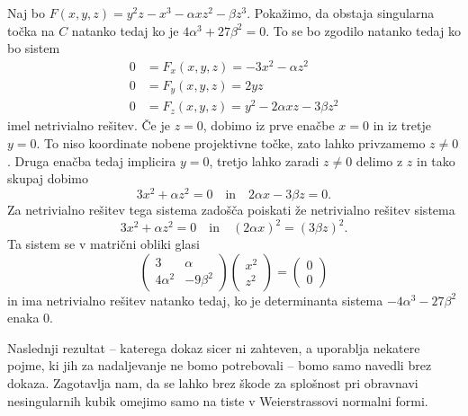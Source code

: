 \documentclass[mat1]{fmfdelo}
\numberwithin{equation}{section}
\theoremstyle{definition}
\begin{document}
\begin{dokaz}
    Naj bo $F(x,y,z) = y^2z - x^3 - \alpha xz^2 - \beta z^3$. Pokažimo, da obstaja singularna točka na $C$ natanko tedaj ko je $4\alpha^3 + 27\beta^2 = 0$. To se bo zgodilo natanko tedaj ko bo sistem
    \begin{align*}
        0 &= F_x(x,y,z) = -3x^2 - \alpha z^2\\
        0 &= F_y(x,y,z) = 2yz\\
        0 &= F_z(x,y,z) = y^2 - 2\alpha xz - 3 \beta z^2
    \end{align*}
    imel netrivialno rešitev. Če je $z = 0$, dobimo iz prve enačbe $x = 0$ in iz tretje $y = 0$. To niso koordinate nobene projektivne točke, zato lahko privzamemo $z \neq 0$. Druga enačba tedaj implicira $y = 0$, tretjo lahko zaradi $z \neq 0$ delimo z $z$ in tako skupaj dobimo
    \[
        3x^2 + \alpha z^2 = 0 \quad \text{in} \quad 2\alpha x - 3 \beta z = 0.   
    \]
    Za netrivialno rešitev tega sistema zadošča poiskati že netrivialno rešitev sistema
    \[
        3x^2 + \alpha z^2 = 0 \quad \text{in} \quad (2\alpha x)^2 = (3 \beta z)^2. 
    \]
    Ta sistem se v matrični obliki glasi
    \[
        \begin{pmatrix}
            3 & \alpha \\
            4\alpha^2 & -9\beta^2
        \end{pmatrix} 
        \begin{pmatrix}
            x^2 \\
            z^2
        \end{pmatrix}
        =
        \begin{pmatrix}
            0 \\
            0
        \end{pmatrix}
    \]
    in ima netrivialno rešitev natanko tedaj, ko je determinanta sistema $-4\alpha^3 - 27\beta^2$ enaka $0$. 
\end{dokaz}


Naslednji rezultat -- katerega dokaz sicer ni zahteven, a uporablja nekatere pojme, ki jih za nadaljevanje ne bomo potrebovali -- bomo samo navedli brez dokaza. Zagotavlja nam, da se lahko brez škode za splošnost pri obravnavi nesingularnih kubik omejimo samo na tiste v Weierstrassovi normalni formi. 


\end{document}
